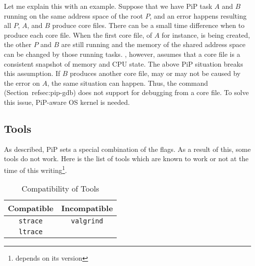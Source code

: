 Let me explain this with an example. Suppose that we have PiP task $A$
and $B$ running on the same address space of the root $P$, and an
error happens resulting all $P$, $A$, and $B$ produce core
files. There can be a small time difference when to produce each core
file. When the first core file, of $A$ for instance, is being created,
the other $P$ and $B$ are still running and the memory of the shared 
address space can be changed by those running tasks.
, however, assumes that a core file is a consistent snapshot
of memory and CPU state. The above PiP situation breaks this
assumption. If $B$ produces another core file, may or may not be
caused by the error on $A$, the same situation can happen.
Thus, the  command (Section~ref{sec:pip-gdb}) does
not support for debugging from a core file. To solve this issue,
PiP-aware OS kernel is needed. 

\subsection{Tools}

As described, PiP sets a special combination of the 
flags. As a result of this, some tools do not work. Here is the list
of tools which are known to work or not at the time of this
writing\footnote{ depends on its version}. 

\begin{table}[ht]
  \centering
  \caption{Compatibility of Tools}
  \vspace{3mm}
  \begin{tabular}{c|c}
    \hline
    Compatible & Incompatible \\
    \hline
        {\tt strace} & {\tt valgrind} \\
        {\tt ltrace} \\
        \hline
  \end{tabular}
\end{table}
